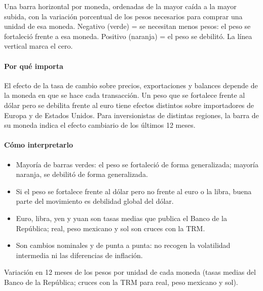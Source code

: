 \begin{leer}
Una barra horizontal por moneda, ordenadas de la mayor caída a la mayor subida, con la variación porcentual de los pesos necesarios para comprar una unidad de esa moneda. Negativo (verde) = se necesitan menos pesos: el peso se fortaleció frente a esa moneda. Positivo (naranja) = el peso se debilitó. La línea vertical marca el cero.
\end{leer}

\paragraph{Por qué importa}
El efecto de la tasa de cambio sobre precios, exportaciones y balances depende de la moneda en que se hace cada transacción. Un peso que se fortalece frente al dólar pero se debilita frente al euro tiene efectos distintos sobre importadores de Europa y de Estados Unidos. Para inversionistas de distintas regiones, la barra de su moneda indica el efecto cambiario de los últimos 12 meses.

\paragraph{Cómo interpretarlo}
\begin{itemize}
\item Mayoría de barras verdes: el peso se fortaleció de forma generalizada; mayoría naranja, se debilitó de forma generalizada.
\item Si el peso se fortalece frente al dólar pero no frente al euro o la libra, buena parte del movimiento es debilidad global del dólar.
\item Euro, libra, yen y yuan son tasas medias que publica el Banco de la República; real, peso mexicano y sol son cruces con la TRM.
\item Son cambios nominales y de punta a punta: no recogen la volatilidad intermedia ni las diferencias de inflación.
\end{itemize}
\begin{formulas}[Fórmulas]
\end{formulas}
\begin{metodo}[Metodología]
Variación en 12 meses de los pesos por unidad de cada moneda (tasas medias del Banco de la República; cruces con la TRM para real, peso mexicano y sol).
\par{}
\end{metodo}

